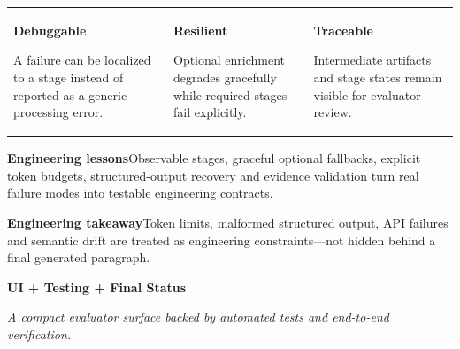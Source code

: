 \documentclass[9pt,a4paper]{extarticle}
\newcommand{\tagline}[1]{{\large\color{charcoal}\itshape #1\par}}
\begin{document}
\vspace{4pt}
\begin{tabularx}{\textwidth}{@{}XXX@{}}
\begin{notecard}\textbf{Debuggable}\par A failure can be localized to a stage instead of reported as a generic processing error.
\end{notecard}&
\begin{notecard}\textbf{Resilient}\par Optional enrichment degrades gracefully while required stages fail explicitly.
\end{notecard}&
\begin{notecard}\textbf{Traceable}\par Intermediate artifacts and stage states remain visible for evaluator review.
\end{notecard}
\end{tabularx}

\begin{card}\textbf{Engineering lessons}\quad Observable stages, graceful optional fallbacks, explicit token budgets, structured-output recovery and evidence validation turn real failure modes into testable engineering contracts.\end{card}

\vspace{8pt}
\begin{darkcard}
\textbf{Engineering takeaway}\quad Token limits, malformed structured output, API failures and semantic drift are treated as engineering constraints—not hidden behind a final generated paragraph.
\end{darkcard}
\newpage

{\fontsize{21}{23}\selectfont\bfseries UI + Testing + Final Status\par}
\tagline{A compact evaluator surface backed by automated tests and end-to-end verification.}
\vspace{1.5pt}
\end{document}
